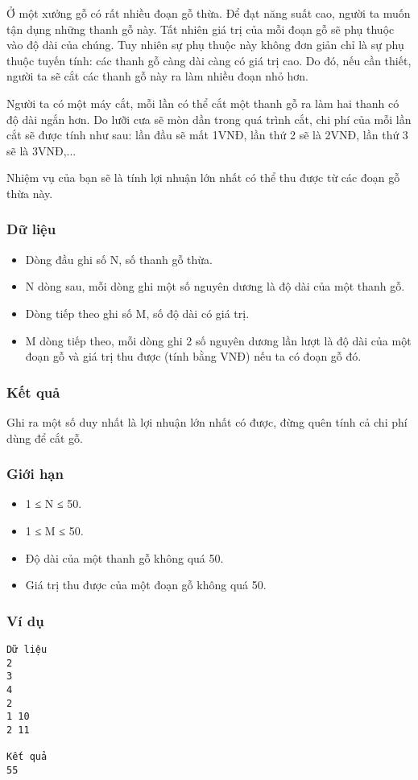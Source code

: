 



   Ở một xưởng gỗ có rất nhiều đoạn gỗ thừa. Để đạt năng suất cao, người ta muốn tận dụng những thanh gỗ này. Tất nhiên giá trị của mỗi đoạn gỗ sẽ phụ thuộc vào độ dài của chúng. Tuy nhiên sự phụ thuộc này không đơn giản chỉ là sự phụ thuộc tuyến tính: các thanh gỗ càng dài càng có giá trị cao. Do đó, nếu cần thiết, người ta sẽ cắt các thanh gỗ này ra làm nhiều đoạn nhỏ hơn.  

   Người ta có một máy cắt, mỗi lần có thể cắt một thanh gỗ ra làm hai thanh có độ dài ngắn hơn. Do lưỡi cưa sẽ mòn dần trong quá trình cắt, chi phí của mỗi lần cắt sẽ được tính như sau: lần đầu sẽ mất 1VNĐ, lần thứ 2 sẽ là 2VNĐ, lần thứ 3 sẽ là 3VNĐ,...  

   Nhiệm vụ của bạn sẽ là tính lợi nhuận lớn nhất có thể thu được từ các đoạn gỗ thừa này.  

\subsubsection{   Dữ liệu  }
\begin{itemize}
	\item     Dòng đầu ghi số N, số thanh gỗ thừa.   
	\item     N dòng sau, mỗi dòng ghi một số nguyên dương là độ dài của một thanh gỗ.   
	\item     Dòng tiếp theo ghi số M, số độ dài có giá trị.   
	\item     M dòng tiếp theo, mỗi dòng ghi 2 số nguyên dương lần lượt là độ dài của một đoạn gỗ và giá trị thu được (tính bằng VNĐ) nếu ta có đoạn gỗ đó.   
\end{itemize}

\subsubsection{   Kết quả  }

   Ghi ra một số duy nhất là lợi nhuận lớn nhất có được, đừng quên tính cả chi phí dùng để cắt gỗ.  

\subsubsection{   Giới hạn  }
\begin{itemize}
	\item     1 ≤ N ≤ 50.   
	\item     1 ≤ M ≤ 50.   
	\item     Độ dài của một thanh gỗ không quá 50.   
	\item     Giá trị thu được của một đoạn gỗ không quá 50.   
\end{itemize}

\subsubsection{   Ví dụ  }
\begin{verbatim}
Dữ liệu
2
3
4
2
1 10
2 11

Kết quả
55
\end{verbatim}